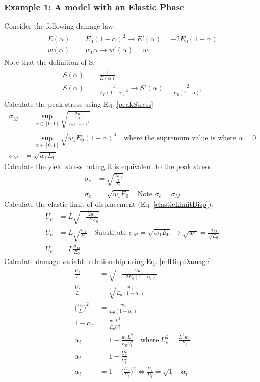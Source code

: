 \documentclass[12pt,3p]{article}
\numberwithin{equation}{section}
\begin{document}
\subsubsection{Example 1: A model with an Elastic Phase}
Consider the following damage law:
\begin{align}\label{ex1DamageLaw}
\begin{split}
E(\alpha) &= E_0 (1 - \alpha)^2 \rightarrow E'(\alpha) = - 2 E_0 (1 - \alpha)\\
w(\alpha) &= w_1 \alpha \rightarrow w'(\alpha) = w_1 
\end{split}
\end{align}
Note that the definition of S: 
\begin{align}\label{ex1S}
\begin{split}
S(\alpha) &= \frac{1}{E(\alpha)} \\
S(\alpha) &= \frac{1}{E_0 (1 - \alpha)^2} \rightarrow S'(\alpha) = \frac{2}{E_0 (1 - \alpha)^3}
\end{split}
\end{align}
Calculate the peak stress using Eq. \ref{peakStress}
\begin{align*}
\sigma_M &= \sup_{\alpha \in [0, 1]} \sqrt{\frac{2 w_1}{ \frac{2}{E_0 (1 - \alpha)^3} }} \\
		&= \sup_{\alpha \in [0, 1]} \sqrt{w_1 E_0 (1 - \alpha)^3} \quad \text{where the supremum value is where } \alpha = 0 \\
\sigma_M &= \sqrt{w_1 E_0}
\end{align*}
Calculate the yield stress noting it is equivalent to the peak stress
\begin{align*}
\sigma_e &= \sqrt{\frac{2w_1}{\frac{2}{E_0}}} \\
\sigma_e &= \sqrt{w_1 E_0} \quad \text{Note } \sigma_e = \sigma_M
\end{align*}
Calculate the elastic limit of displacement (Eq. \ref{elasticLimitDisp}):
\begin{align*}
U_e &= L \sqrt{- \frac{2 w_1}{-2 E_0}} \\
U_e &= L \sqrt{\frac{w_1}{E_0}} \quad \text{Substitute } \sigma_M = \sqrt{w_1 E_0} \rightarrow \sqrt{w_1} = \frac{\sigma_M}{\sqrt{E_0}} \\
U_e &=  L \frac{\sigma_M}{E_0}
\end{align*}
Calculate damage variable relationship using Eq. \ref{relDispDamage}
\begin{align*}
\frac{U_t}{L} &= \sqrt{- \frac{2 w_1}{-2 E_0 (1 - \alpha_t)}} \\
\frac{U_t}{L} &= \sqrt{\frac{w_1}{E_0 (1 - \alpha_t)}} \\
\bigg( \frac{U_t}{L} \bigg)^2 &= \frac{w_1}{E_0 (1 - \alpha_t)} \\
1 - \alpha_t &= \frac{w_1 L^2}{E_0 U_t^2} \\
\alpha_t &= 1 - \frac{w_1 L^2}{E_0 U_t^2} \quad \text{where } U_e^2 = \frac{L^2 w_1}{E_0} \\
\alpha_t &= 1 - \frac{U_e^2}{U_t^2} \\
\alpha_t &= 1 - \bigg( \frac{U_e}{U_t} \bigg)^2 \Leftrightarrow \frac{U_e}{U_t} = \sqrt{1 - \alpha_t}
\end{align*}
\end{document}
